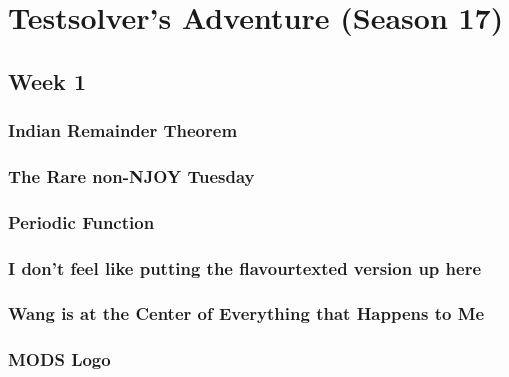\documentclass[titlepage=true]{scrartcl}
\begin{document}
{
\section{Testsolver's Adventure (Season 17)}

    \subsection{Week 1}

    \subsubsection{Indian Remainder Theorem}
    \label{17-1-1}
    
    \newpage

    \subsubsection{The Rare non-NJOY Tuesday}
	\label{17-1-2}
	
	\newpage

    \subsubsection{Periodic Function}
	\label{17-1-3}
	
	\newpage

    \subsubsection{I don't feel like putting the flavourtexted version up here}
	\label{17-1-4}
	
	\newpage
	
	\subsubsection{Wang is at the Center of Everything that Happens to Me}
	\label{17-1-5}
	
	\newpage

    \setcounter{subsubsection}{6}
	\subsubsection{MODS Logo}
	\label{17-1-7}
	
	\newpage
    
}
\end{document}

